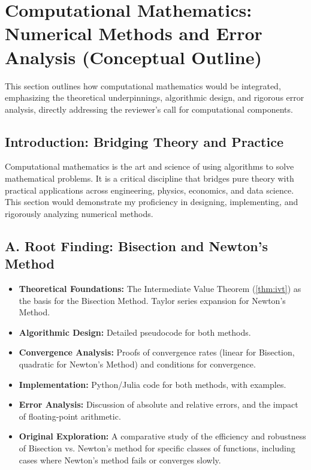 \documentclass[11pt, a4paper]{article}
\theoremstyle{plain} %
\theoremstyle{definition} %
\theoremstyle{remark} %
\begin{document}
\newpage
\section{Computational Mathematics: Numerical Methods and Error Analysis (Conceptual Outline)}
\label{sec:computational_outline}

This section outlines how computational mathematics would be integrated, emphasizing the theoretical underpinnings, algorithmic design, and rigorous error analysis, directly addressing the reviewer's call for computational components.

\subsection{Introduction: Bridging Theory and Practice}

Computational mathematics is the art and science of using algorithms to solve mathematical problems. It is a critical discipline that bridges pure theory with practical applications across engineering, physics, economics, and data science. This section would demonstrate my proficiency in designing, implementing, and rigorously analyzing numerical methods.

\subsection{A. Root Finding: Bisection and Newton's Method}
\begin{itemize}
    \item \textbf{Theoretical Foundations:} The Intermediate Value Theorem (\ref{thm:ivt}) as the basis for the Bisection Method. Taylor series expansion for Newton's Method.
    \item \textbf{Algorithmic Design:} Detailed pseudocode for both methods.
    \item \textbf{Convergence Analysis:} Proofs of convergence rates (linear for Bisection, quadratic for Newton's Method) and conditions for convergence.
    \item \textbf{Implementation:} Python/Julia code for both methods, with examples.
    \item \textbf{Error Analysis:} Discussion of absolute and relative errors, and the impact of floating-point arithmetic.
\item \textbf{Original Exploration:} A comparative study of the efficiency and robustness of Bisection vs. Newton's method for specific classes of functions, including cases where Newton's method fails or converges slowly.
\end{itemize}
\end{document}
